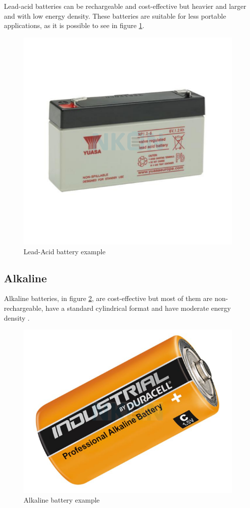 Lead-acid batteries can be rechargeable and cost-effective but heavier and larger and with low energy density.
These batteries are suitable for less portable applications, \cite{BATT3} as it is possible to see in figure \ref{fig:lead}.
\begin{figure}[H]
    \centering
    \includegraphics[scale=0.4]{ch3/assets/lead.png}
    \caption{Lead-Acid battery example \cite{lead}}
    \label{fig:lead}
\end{figure}

\subsection{Alkaline}
Alkaline batteries, in figure \ref{fig:alkaline}, are cost-effective but most of them are non-rechargeable, have a standard cylindrical format and have moderate energy density \cite{BATT3}.
\begin{figure}[H]
    \centering
    \includegraphics[scale=0.3]{ch3/assets/alkaline.png}
    \caption{Alkaline battery example \cite{alkaline}}
    \label{fig:alkaline}
\end{figure}

